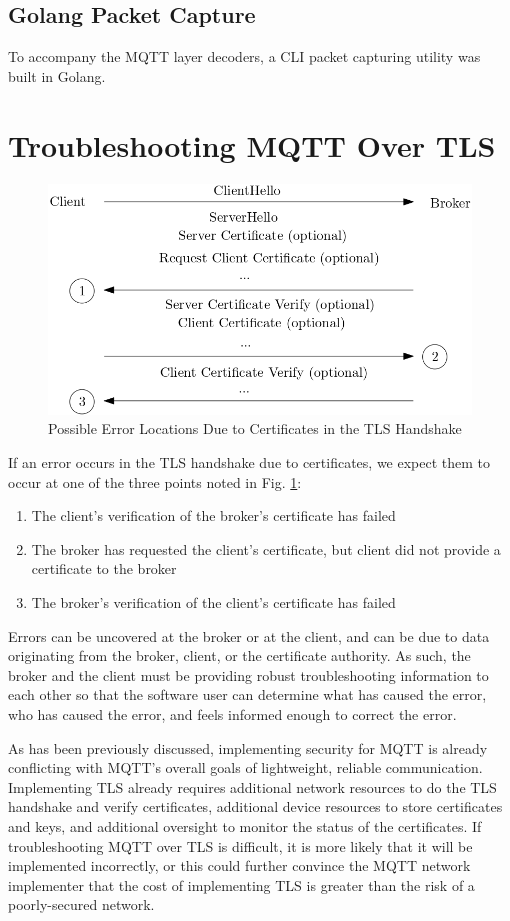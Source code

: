 \documentclass[12pt]{article}
\begin{document}
\subsection{Golang Packet Capture}
To accompany the MQTT layer decoders, a CLI packet capturing utility was built in Golang. 

\section{Troubleshooting MQTT Over TLS}
\begin{figure}[!htb]
\centering
	\includegraphics[scale=0.5]{tls-handshake.png}
	\caption{Possible Error Locations Due to Certificates in the TLS Handshake\label{fig:handshake}}
\end{figure}
If an error occurs in the TLS handshake due to certificates, we expect them to occur at one of the three points noted in Fig. \ref{fig:handshake}:
\begin{enumerate}
	\item The client's verification of the broker's certificate has failed
	\item The broker has requested the client's certificate, but client did not provide a certificate to the broker
	\item The broker's verification of the client's certificate has failed
\end{enumerate}
Errors can be uncovered at the broker or at the client, and can be due to data originating from the broker, client, or the certificate authority. As such, the broker and the client must be providing robust troubleshooting information to each other so that the software user can determine what has caused the error, who has caused the error, and feels informed enough to correct the error.\par
As has been previously discussed, implementing security for MQTT is already conflicting with MQTT's overall goals of lightweight, reliable communication. Implementing TLS already requires additional network resources to do the TLS handshake and verify certificates, additional device resources to store certificates and keys, and additional oversight to monitor the status of the certificates. If troubleshooting MQTT over TLS is difficult, it is more likely that it will be implemented incorrectly, or this could further convince the MQTT network implementer that the cost of implementing TLS is greater than the risk of a poorly-secured network.
\end{document}

